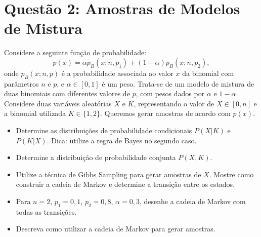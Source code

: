 \section*{Questão 2: Amostras de Modelos de Mistura}

Considere a seguinte função de probabilidade:
\[
p(x) = \alpha p_B(x; n, p_1) + (1 - \alpha)p_B(x; n, p_2),
\]
onde $p_B(x; n, p)$ é a probabilidade associada ao valor $x$ da binomial com parâmetros $n$ e $p$, e $\alpha \in [0,1]$ é um peso. Trata-se de um modelo de mistura de duas binomiais com diferentes valores de $p$, com pesos dados por $\alpha$ e $1 - \alpha$. Considere duas variáveis aleatórias $X$ e $K$, representando o valor de $X \in [0, n]$ e a binomial utilizada $K \in \{1, 2\}$. Queremos gerar amostras de acordo com $p(x)$.

\begin{itemize}
  \item Determine as distribuições de probabilidade condicionais $P(X|K)$ e $P(K|X)$. Dica: utilize a regra de Bayes no segundo caso.
  \begin{resposta}
  \end{resposta}
  \item Determine a distribuição de probabilidade conjunta $P(X, K)$.
  \begin{resposta}
  \end{resposta}
  \item Utilize a técnica de Gibbs Sampling para gerar amostras de $X$. Mostre como construir a cadeia de Markov e determine a transição entre os estados.
  \begin{resposta}
  \end{resposta}
  \item Para $n = 2$, $p_1 = 0{,}1$, $p_2 = 0{,}8$, $\alpha = 0{,}3$, desenhe a cadeia de Markov com todas as transições.
  \begin{resposta}
  \end{resposta}
  \item Descreva como utilizar a cadeia de Markov para gerar amostras.
  \begin{resposta}
  \end{resposta}
\end{itemize}

